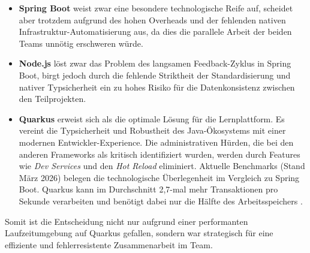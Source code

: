 \begin{itemize}
	\item \textbf{Spring Boot} weist zwar eine besondere technologische Reife auf, scheidet aber trotzdem aufgrund des hohen Overheads und der fehlenden nativen Infrastruktur-Automatisierung aus, da dies die parallele Arbeit der beiden Teams unnötig erschweren würde.
	
	\item \textbf{Node.js} löst zwar das Problem des langsamen Feedback-Zyklus in Spring Boot, birgt jedoch durch die fehlende Striktheit der Standardisierung und nativer Typsicherheit ein zu hohes Risiko für die Datenkonsistenz zwischen den Teilprojekten.
	
	\item \textbf{Quarkus} erweist sich als die optimale Lösung für die Lernplattform. Es vereint die Typsicherheit und Robustheit des Java-Ökosystems mit einer modernen Entwickler-Experience. Die administrativen Hürden, die bei den anderen Frameworks als kritisch identifiziert wurden, werden durch Features wie \textit{Dev Services} und den \textit{Hot Reload} eliminiert. Aktuelle Benchmarks (Stand März 2026) belegen die technologische Überlegenheit im Vergleich zu Spring Boot. Quarkus kann im Durchschnitt 2,7-mal mehr Transaktionen pro Sekunde verarbeiten und benötigt dabei nur die Hälfte des Arbeitsspeichers \cite{QuarkusBenchmarks}.
\end{itemize}

Somit ist die Entscheidung nicht nur aufgrund einer performanten Laufzeitumgebung auf Quarkus gefallen, sondern war strategisch für eine effiziente und fehlerresistente Zusammenarbeit im Team.